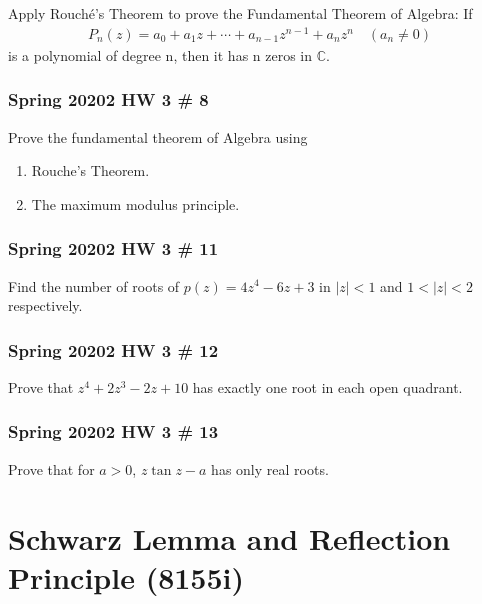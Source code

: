 Apply Rouché's Theorem to prove the Fundamental Theorem of Algebra: If
\begin{align*}P_n(z) = a_0 + a_1z + \cdots + a_{n-1}z^{n-1} + a_nz^n\quad  (a_n \neq 0)\end{align*}
is a polynomial of degree n, then it has n zeros in \(\mathbb C\).

\hypertarget{spring-20202-hw-3-8}{%
\subsubsection{Spring 20202 HW 3 \# 8}\label{spring-20202-hw-3-8}}

Prove the fundamental theorem of Algebra using

\begin{enumerate}
\def\labelenumi{\alph{enumi}.}
\item
  Rouche's Theorem.
\item
  The maximum modulus principle.
\end{enumerate}

\hypertarget{spring-20202-hw-3-11}{%
\subsubsection{Spring 20202 HW 3 \# 11}\label{spring-20202-hw-3-11}}

Find the number of roots of \(p(z) = 4z^4 - 6z + 3\) in
\({\left\lvert {z} \right\rvert} < 1\) and
\(1 < {\left\lvert {z} \right\rvert} < 2\) respectively.

\hypertarget{spring-20202-hw-3-12}{%
\subsubsection{Spring 20202 HW 3 \# 12}\label{spring-20202-hw-3-12}}

Prove that \(z^4 + 2z^3 -2z + 10\) has exactly one root in each open
quadrant.

\hypertarget{spring-20202-hw-3-13}{%
\subsubsection{Spring 20202 HW 3 \# 13}\label{spring-20202-hw-3-13}}

Prove that for \(a> 0\), \(z\tan z - a\) has only real roots.

\hypertarget{schwarz-lemma-and-reflection-principle-8155i}{%
\section{Schwarz Lemma and Reflection Principle
(8155i)}\label{schwarz-lemma-and-reflection-principle-8155i}}

